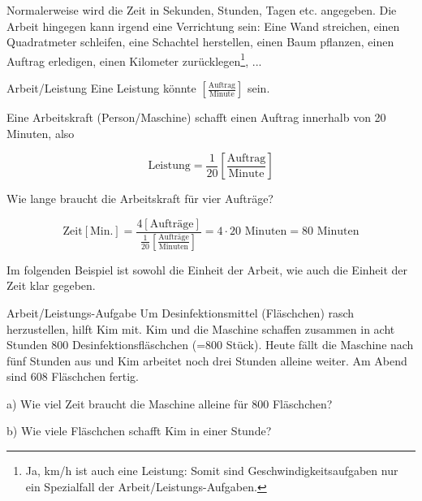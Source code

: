 Normalerweise wird die Zeit in Sekunden, Stunden, Tagen etc. angegeben. Die
Arbeit hingegen kann irgend eine Verrichtung sein: Eine Wand
streichen, einen Quadratmeter schleifen, eine Schachtel herstellen,
einen Baum pflanzen, einen Auftrag erledigen, einen Kilometer zurücklegen\footnote{Ja, km/h ist auch eine Leistung: Somit sind Geschwindigkeitsaufgaben nur ein Spezialfall der Arbeit/Leistungs-Aufgaben.}, ...

\begin{beispiel}{Arbeit/Leistung}{}
  Eine Leistung könnte  $\left[\frac{\text{Auftrag}}{\text{Minute}}\right]$ sein.

  Eine Arbeitskraft (Person/Maschine) schafft einen Auftrag innerhalb von 20 Minuten, also

  $$\text{Leistung} = \frac1{20} \left[\frac{\text{Auftrag}}{\text{Minute}}\right]$$

  Wie lange braucht die Arbeitskraft für vier Aufträge?

  $$\text{Zeit} [\text{Min.}] = \frac{4[\text{Aufträge}]}{\frac{1}{20} \left[\frac{\text{Aufträge}}{\text{Minuten}}\right]} = 4\cdot{} 20 \text{ Minuten} = 80 \text{ Minuten}$$
\end{beispiel}
\newpage

Im folgenden Beispiel ist sowohl die Einheit der Arbeit, wie auch die
Einheit der Zeit klar gegeben.

\begin{beispiel}{Arbeit/Leistungs-Aufgabe}{}
  Um Desinfektionsmittel (Fläschchen) rasch herzustellen, hilft Kim mit.
  Kim und die Maschine schaffen zusammen in acht Stunden 800
  Desinfektionsfläschchen (=800 Stück).
  Heute fällt die Maschine nach fünf Stunden aus und Kim arbeitet noch
  drei Stunden alleine weiter. Am Abend sind 608 Fläschchen fertig.

  a) Wie viel Zeit braucht die Maschine alleine für 800 Fläschchen?

  b) Wie viele Fläschchen schafft Kim in einer Stunde?
\end{beispiel}


